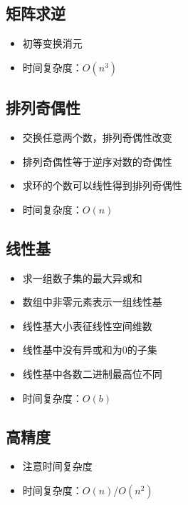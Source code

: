 \documentclass[twocolumn,a4,8pt]{article}  %
\begin{document}
		\subsection{矩阵求逆}
	 		\noindent\begin{itemize}
		 		\item 初等变换消元
		 		\item 时间复杂度：$O(n^3)$
	 		\end{itemize}
	 	 	
	 	 	
		\subsection{排列奇偶性}
	 		\noindent\begin{itemize}
		 		\item 交换任意两个数，排列奇偶性改变
				\item 排列奇偶性等于逆序对数的奇偶性
				\item 求环的个数可以线性得到排列奇偶性
		 		\item 时间复杂度：$O(n)$
	 		\end{itemize}
	 	 	

		\subsection{线性基}
	 		\noindent\begin{itemize}
		 		\item 求一组数子集的最大异或和
				\item 数组中非零元素表示一组线性基
				\item 线性基大小表征线性空间维数
				\item 线性基中没有异或和为0的子集
				\item 线性基中各数二进制最高位不同
		 		\item 时间复杂度：$O(b)$
	 		\end{itemize}
	 	 	

	 	\subsection{高精度}
	 		\noindent\begin{itemize}
		 		\item 注意时间复杂度
		 		\item 时间复杂度：$O(n)$/$O(n^2)$
	 		\end{itemize}
	 	 	
	 	 	
\end{document}
